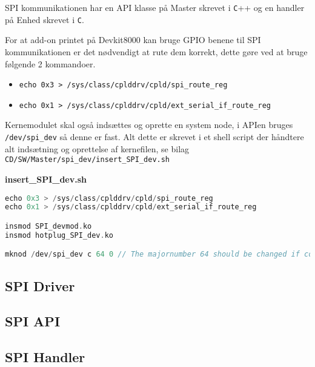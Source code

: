 


SPI kommunikationen har en API klasse på Master skrevet i \verb+C+++ og en handler på Enhed skrevet i \verb+C+.

For at add-on printet på Devkit8000 kan bruge GPIO benene til SPI kommunikationen er det nødvendigt at rute dem korrekt, dette gøre ved at bruge følgende 2 kommandoer.

\begin{itemize}
\item \verb+echo 0x3 > /sys/class/cplddrv/cpld/spi_route_reg+
\item \verb+echo 0x1 > /sys/class/cplddrv/cpld/ext_serial_if_route_reg+
\end{itemize}

Kernemodulet skal også indsættes og oprette en system node, i APIen bruges \verb+/dev/spi_dev+ så denne er fast.
Alt dette er skrevet i et shell script der håndtere alt indsætning og oprettelse af kernefilen, se bilag \verb+CD/SW/Master/spi_dev/insert_SPI_dev.sh+

\textbf{insert\_SPI\_dev.sh}

\begin{lstlisting}[language=C]
echo 0x3 > /sys/class/cplddrv/cpld/spi_route_reg
echo 0x1 > /sys/class/cplddrv/cpld/ext_serial_if_route_reg

insmod SPI_devmod.ko
insmod hotplug_SPI_dev.ko

mknod /dev/spi_dev c 64 0 // The majornumber 64 should be changed if conflict occur
\end{lstlisting}


\subsection{SPI Driver}



\subsection{SPI API}




\subsection{SPI Handler}



